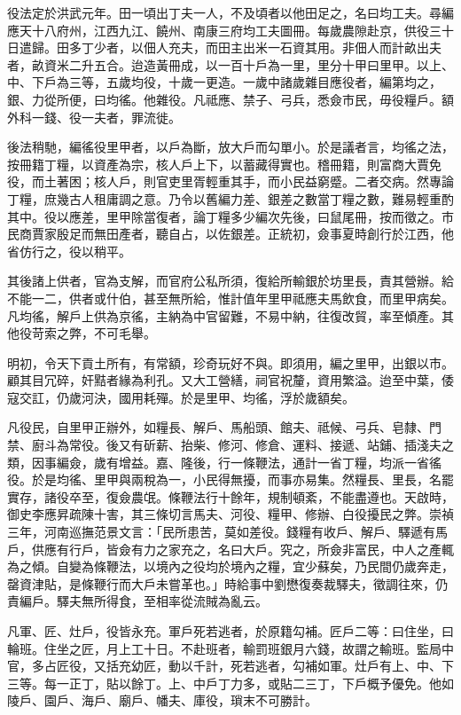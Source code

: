 役法定於洪武元年。田一頃出丁夫一人，不及頃者以他田足之，名曰均工夫。尋編應天十八府州，江西九江、饒州、南康三府均工夫圖冊。每歲農隙赴京，供役三十日遣歸。田多丁少者，以佃人充夫，而田主出米一石資其用。非佃人而計畝出夫者，畝資米二升五合。迨造黃冊成，以一百十戶為一里，里分十甲曰里甲。以上、中、下戶為三等，五歲均役，十歲一更造。一歲中諸歲雜目應役者，編第均之，銀、力從所便，曰均徭。他雜役。凡祗應、禁子、弓兵，悉僉市民，毋役糧戶。額外科一錢、役一夫者，罪流徙。

後法稍馳，編徭役里甲者，以戶為斷，放大戶而勾單小。於是議者言，均徭之法，按冊籍丁糧，以資產為宗，核人戶上下，以蓄藏得實也。稽冊籍，則富商大賈免役，而土著困；核人戶，則官吏里胥輕重其手，而小民益窮蹙。二者交病。然專論丁糧，庶幾古人租庸調之意。乃令以舊編力差、銀差之數當丁糧之數，難易輕重酌其中。役以應差，里甲除當復者，論丁糧多少編次先後，曰鼠尾冊，按而徵之。市民商賈家殷足而無田產者，聽自占，以佐銀差。正統初，僉事夏時創行於江西，他省仿行之，役以稍平。

其後諸上供者，官為支解，而官府公私所須，復給所輸銀於坊里長，責其營辦。給不能一二，供者或什伯，甚至無所給，惟計值年里甲祗應夫馬飲食，而里甲病矣。凡均徭，解戶上供為京徭，主納為中官留難，不易中納，往復改貿，率至傾產。其他役苛索之弊，不可毛舉。

明初，令天下貢土所有，有常額，珍奇玩好不與。即須用，編之里甲，出銀以市。顧其目冗碎，奸黠者緣為利孔。又大工營繕，祠官祝釐，資用繁溢。迨至中葉，倭寇交訌，仍歲河決，國用耗殫。於是里甲、均徭，浮於歲額矣。

凡役民，自里甲正辦外，如糧長、解戶、馬船頭、館夫、祗候、弓兵、皂隸、門禁、廚斗為常役。後又有斫薪、抬柴、修河、修倉、運料、接遞、站鋪、插淺夫之類，因事編僉，歲有增益。嘉、隆後，行一條鞭法，通計一省丁糧，均派一省徭役。於是均徭、里甲與兩稅為一，小民得無擾，而事亦易集。然糧長、里長，名罷實存，諸役卒至，復僉農氓。條鞭法行十餘年，規制頓紊，不能盡遵也。天啟時，御史李應昇疏陳十害，其三條切言馬夫、河役、糧甲、修辦、白役擾民之弊。崇禎三年，河南巡撫范景文言：「民所患苦，莫如差役。錢糧有收戶、解戶、驛遞有馬戶，供應有行戶，皆僉有力之家充之，名曰大戶。究之，所僉非富民，中人之產輒為之傾。自變為條鞭法，以境內之役均於境內之糧，宜少蘇矣，乃民間仍歲奔走，罄資津貼，是條鞭行而大戶未嘗革也。」時給事中劉懋復奏裁驛夫，徵調往來，仍責編戶。驛夫無所得食，至相率從流賊為亂云。

凡軍、匠、灶戶，役皆永充。軍戶死若逃者，於原籍勾補。匠戶二等：曰住坐，曰輪班。住坐之匠，月上工十日。不赴班者，輸罰班銀月六錢，故謂之輸班。監局中官，多占匠役，又括充幼匠，動以千計，死若逃者，勾補如軍。灶戶有上、中、下三等。每一正丁，貼以餘丁。上、中戶丁力多，或貼二三丁，下戶概予優免。他如陵戶、園戶、海戶、廟戶、幡夫、庫役，瑣末不可勝計。

